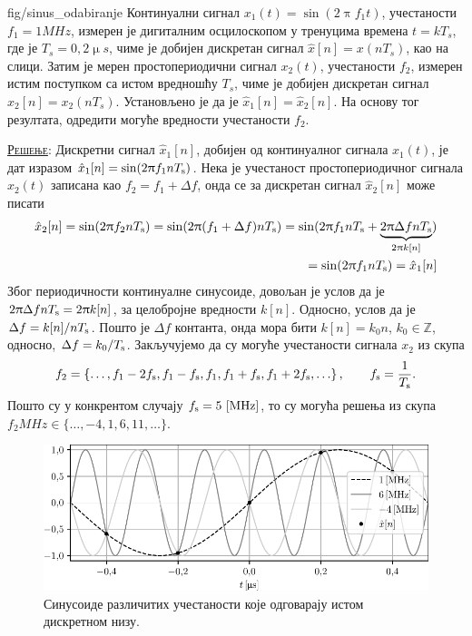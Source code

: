 \noindent
\begin{slikaDesno}{fig/sinus_odabiranje}
    \PID Континуални сигнал $x_1(t) = \sin(2\uppi f_1 t)$, учестаности $f_1 = 1\unit{MHz}$, измерен је 
    дигиталним осцилоскопом у тренуцима времена
    $t = kT_s$, где је ${T_s = 0,2\unit{\upmu s}}$, чиме је добијен дискретан сигнал $\hat x[n] = x(nT_s)$, као на слици.
    Затим је мерен простопериодични сигнал $x_2(t)$, учестаности $f_2$, измерен истим поступком 
    са истом вредношћу $T_s$, чиме је добијен дискретан сигнал $\hat x_2[n] = x_2(nT_s)$. 
    Установљено је да је $\hat x_1[n] = \hat x_2[n]$. 
    На основу тог резултата, одредити могуће вредности учестаности $f_2$.
\end{slikaDesno}

\textsc{\underline{Решење}}:
Дискретни сигнал $\hat x_1[n]$, добијен од континуалног сигнала $x_1(t)$, је дат изразом 
$
\hat x_1[n] = \sin(2\uppi f_1 n T_{\rm s}) 
$. Нека је учестаност простопериодичног сигнала $x_2(t)$ записана као $f_2 = f_1 + \Delta f$, онда се за дискретан сигнал 
$\hat x_2[n]$ може писати
\begin{eqnarray}
    \hat x_2[n] = \sin(2\uppi f_2 nT_{\rm s}) = \sin(2\uppi (f_1 + \Delta f) nT_{\rm s}) 
    = \sin(2\uppi f_1 n T_{\rm s} + \underbrace{2\uppi \Delta f n T_{\rm s}}_{2\uppi k[n]}  ) \\
    = \sin(2\uppi f_1 n T_{\rm s}) = \hat x_1[n]
\end{eqnarray}
Због периодичности континуалне синусоиде, довољан је услов да је $2\uppi \Delta f n T_{\rm s} = 2\uppi k[n]$, за целобројне вредности $k[n]$.
Односно, услов да је $\Delta f = k[n]/nT_{\rm s}$. Пошто је $\Delta f$ контанта, онда мора бити $k[n] = k_0 n$, 
$k_0 \in \mathbb Z$, односно, $\Delta f = k_0/T_{\rm s}$. Закључујемо да су  могуће учестаности сигнала $x_2$
из скупа
\begin{eqnarray}
    f_2 = \left\{
    \ldots,
    f_1 - 2 f_{\rm s},
    f_1 - f_{\rm s},
    f_1,
    f_1 + f_{\rm s},
    f_1 + 2 f_{\rm s},
    \ldots
    \right\}, \qquad f_{\rm s} = \dfrac{1}{T_{\rm s}}.
\end{eqnarray}
Пошто су у конкрентом случају $f_{\rm s} = 5\,\left[\mathrm{MHz}\right]$, то су могућа решења из скупа
$f_2\unit{MHz} \in \{\ldots, -4 ,1, 6, 11, \ldots\}$.

\begin{figure}[ht!]
    \includegraphics{fig/sinus_odabiranje_rekonstrukcija.pdf}
    \caption{Синусоиде различитих учестаности које одговарају истом дискретном низу.}
\end{figure}

